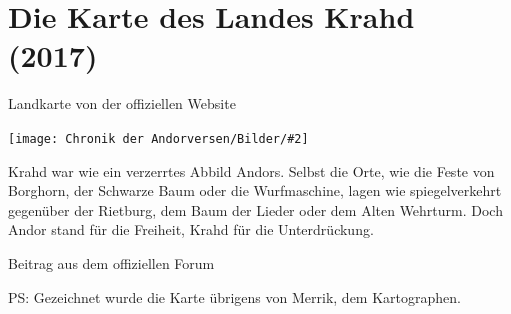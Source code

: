 \documentclass[10pt, a4paper, oneside]{book}
\newcommand{\produkt}[1]{%
    \section{#1}%
    \label{Produkt: #1}%
}
\newcommand{\bildmitts}[2][height=0.32\textwidth,width=0.48\textwidth,keepaspectratio]{%
    \begin{center}
        \texttt{[image: Chronik der Andorversen/Bilder/\#2]}
    \end{center}
}
\begin{document}
\newpage
\produkt{Die Karte des Landes Krahd (2017)}

\begin{center}
    Landkarte von der offiziellen Website
\end{center}

\bildmitts[width=\textwidth]{Die Karte des Landes Krahd.jpg}

Krahd war wie ein verzerrtes Abbild Andors. Selbst die Orte, wie die Feste von Borghorn, der Schwarze Baum oder die Wurfmaschine, lagen wie spiegelverkehrt gegenüber der Rietburg, dem Baum der Lieder oder dem Alten Wehrturm. Doch Andor stand für die Freiheit, Krahd für die Unterdrückung.

\begin{center}
    Beitrag aus dem offiziellen Forum
\end{center}

PS: Gezeichnet wurde die Karte übrigens von Merrik, dem Kartographen.


\newpage
\end{document}
